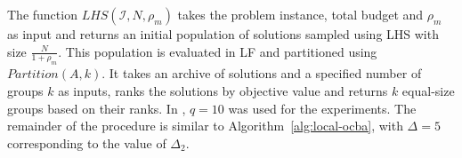 The function $LHS(\mathcal{I},N,\rho_m)$ takes the problem instance, total budget and $\rho_m$ as input and returns an initial population of solutions sampled using LHS with size $\frac{N}{1+\rho_m}$. This population is evaluated in LF and partitioned using $Partition(A,k)$. It takes an archive of solutions and a specified number of groups $k$ as inputs, ranks the solutions by objective value and returns $k$ equal-size groups based on their ranks. In \cite{xu2016mo2tos}, $q=10$ was used for the experiments. The remainder of the procedure is similar to Algorithm~\ref{alg:local-ocba}, with $\Delta = 5$ corresponding to the value of $\Delta_2$.